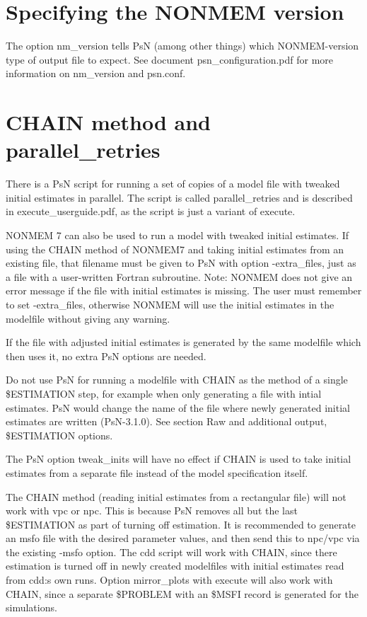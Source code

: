 \section{Specifying the NONMEM version}

The option nm\_version tells PsN (among other things) which NONMEM-version type of output file to expect. See document psn\_configuration.pdf for more information on nm\_version and psn.conf.

\section{CHAIN method and parallel\_retries}

There is a PsN script for running a set of copies of a model file with tweaked initial estimates in parallel. The script is called parallel\_retries and is described in execute\_userguide.pdf, as the script is just a variant of execute.

NONMEM 7 can also be used to run a model with tweaked initial estimates. If using the CHAIN method of NONMEM7 and taking initial estimates from an existing file, that filename must be given to PsN with option -extra\_files, just as a file with a user-written Fortran subroutine. Note: NONMEM does not give an error message if the file with initial estimates is missing. The user must remember to set -extra\_files, otherwise NONMEM will use the initial estimates in the modelfile without giving any warning.

If the file with adjusted initial estimates is generated by the same modelfile which then uses it, no extra PsN options are needed.

Do not use PsN for running a modelfile with CHAIN as the method of a single \$ESTIMATION step, for example when only generating a file with intial estimates. PsN would change the name of the file where newly generated initial estimates are written (PsN-3.1.0). See section Raw and additional output, \$ESTIMATION options.

The PsN option tweak\_inits will have no effect if CHAIN is used to take initial estimates from a separate file instead of the model specification itself.

The CHAIN method (reading initial estimates from a rectangular file) will not work with vpc or npc. This is because PsN removes all but the last \$ESTIMATION as part of turning off estimation. It is recommended to generate an msfo file with the desired parameter values, and then send this to npc/vpc via the existing -msfo option. The cdd script will work with CHAIN, since there estimation is turned off in newly created modelfiles with initial estimates read from cdd:s own runs. Option mirror\_plots with execute will also work with CHAIN, since a separate \$PROBLEM with an \$MSFI record is generated for the simulations.

